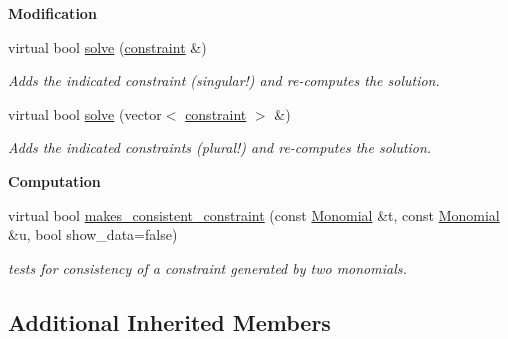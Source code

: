 \begin{Indent}\textbf{ Modification}\par
\begin{DoxyCompactItemize}
\item 
virtual bool \hyperlink{group___c_l_s_solvers_acb3a10f3961c65b4cf23ff61f0e2310b}{solve} (\hyperlink{group___c_l_s_solvers_classconstraint}{constraint} \&)
\begin{DoxyCompactList}\small\item\em Adds the indicated constraint (singular!) and re-\/computes the solution. \end{DoxyCompactList}\item 
virtual bool \hyperlink{group___c_l_s_solvers_a6d800f0ec270c782e3cf855aa7f59f4c}{solve} (vector$<$ \hyperlink{group___c_l_s_solvers_classconstraint}{constraint} $>$ \&)
\begin{DoxyCompactList}\small\item\em Adds the indicated constraints (plural!) and re-\/computes the solution. \end{DoxyCompactList}\end{DoxyCompactItemize}
\end{Indent}
\begin{Indent}\textbf{ Computation}\par
\begin{DoxyCompactItemize}
\item 
\mbox{\label{group___c_l_s_solvers_ad79040934b5bf246b24aa36f30403dce}} 
virtual bool \hyperlink{group___c_l_s_solvers_ad79040934b5bf246b24aa36f30403dce}{makes\+\_\+consistent\+\_\+constraint} (const \hyperlink{group__polygroup_class_monomial}{Monomial} \&t, const \hyperlink{group__polygroup_class_monomial}{Monomial} \&u, bool show\+\_\+data=false)
\begin{DoxyCompactList}\small\item\em tests for consistency of a constraint generated by two monomials. \end{DoxyCompactList}\end{DoxyCompactItemize}
\end{Indent}
\subsection*{Additional Inherited Members}


